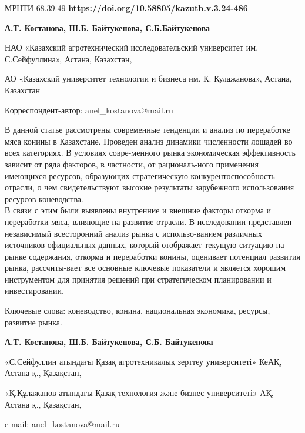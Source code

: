 \newpage
МРНТИ 68.39.49
\hfill {\bfseries \href{https://doi.org/10.58805/kazutb.v.3.24-486}{https://doi.org/10.58805/kazutb.v.3.24-486}}


\begin{center}

{\bfseries А.Т. Костанова\envelope, Ш.Б. Байтукенова, С.Б.Байтукенова}

НАО «Казахский агротехнический исследовательский университет им.
С.Сейфуллина», Астана, Казахстан,

АО «Казахский университет технологии и бизнеса им. К. Кулажанова», Астана, Казахстан
\end{center}

\envelope Корреспондент-автор: anel\_kostanova@mail.ru\vspace{0.5cm}

В данной статье рассмотрены современные тенденции и анализ по
переработке мяса конины в Казахстане. Проведен анализ динамики
численности лошадей во всех категориях. В условиях совре-менного рынка
экономическая эффективность зависит от ряда факторов, в частности, от
рациональ-ного применения имеющихся ресурсов, образующих стратегическую
конкурентоспособность отрасли, о чем свидетельствуют высокие результаты
зарубежного использования ресурсов коневодства. \\В связи с этим были
выявлены внутренние и внешние факторы откорма и переработки мяса,
влияющие на развитие отрасли. В исследовании представлен независимый
всесторонний анализ рынка с использо-ванием различных источников
официальных данных, который отображает текущую ситуацию на рынке
содержания, откорма и переработки конины, оценивает потенциал развития
рынка, рассчиты-вает все основные ключевые показатели и является хорошим
инструментом для принятия решений при стратегическом планировании и
инвестировании.

Ключевые слова: коневодство, конина, национальная экономика, ресурсы,
развитие рынка.

\begin{center}

{\bfseries А.Т. Костанова\envelope, Ш.Б. Байтукенова, С.Б.
Байтукенова}

«С.Сейфуллин атындағы Қазақ агротехникалық зерттеу университеті» КеАҚ, Астана қ., Қазақстан,

«Қ.Құлажанов атындағы Қазақ технология және бизнес университеті» АҚ, Астана қ., Қазақстан,

e-mail: anel\_kostanova@mail.ru
\end{center}

